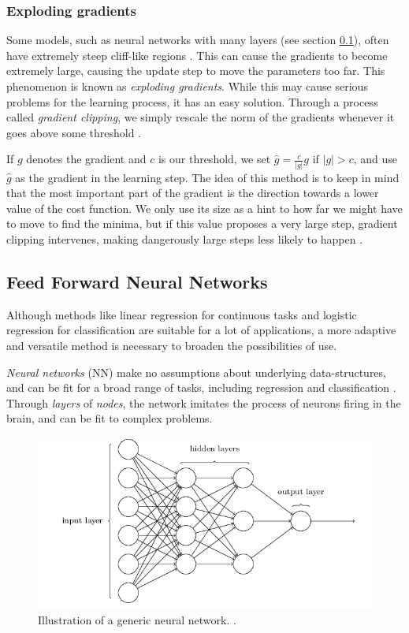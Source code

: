 \subsubsection{Exploding gradients}\label{sec:exploding_gradients}
Some models, such as neural networks with many layers (see section \ref{sec:nn}), often have extremely steep cliff-like regions \citep[p. 285]{Goodfellow-et-al-2016}.
This can cause the gradients to become extremely large, causing the update step to move the parameters too far.
This phenomenon is known as \textit{exploding gradients}.
While this may cause serious problems for the learning process, it has an easy solution.
Through a process called \textit{gradient clipping}, we simply rescale the norm of the gradients whenever it goes above some threshold \citep[p. 93]{Ketkar2017}.

If $g$ denotes the gradient and $c$ is our threshold, we set $\hat{g} = \frac{c}{|g|}g$ if $|g|>c$, and use $\hat{g}$ as the gradient in the learning step.
The idea of this method is to keep in mind that the most important part of the gradient is the direction towards a lower value of the cost function.
We only use its size as a hint to how far we might have to move to find the minima, but if this value proposes a very large step, gradient clipping intervenes, making dangerously large steps less likely to happen \citep[p. 286]{Goodfellow-et-al-2016}.

\subsection{Feed Forward Neural Networks}\label{sec:nn}
Although methods like linear regression for continuous tasks and logistic regression for classification are suitable for a lot of applications, a more adaptive and versatile method is necessary to broaden the possibilities of use. 

\textit{Neural networks} (NN) make no assumptions about underlying data-structures, and can be fit for a broad range of tasks, including regression and classification \citep[Neural networks]{morten}. Through \textit{layers} of \textit{nodes}, the network imitates the process of neurons firing in the brain, and can be fit to complex problems.

\begin{figure}[h!]
    \centering
    \includegraphics[width=1\linewidth]{project_2/figures/generic_NN.png}
    \caption{Illustration of a generic neural network. \cite[Taken from][The architecture of neural networks]{nielsen}.}
    \label{fig:NN}
\end{figure}

